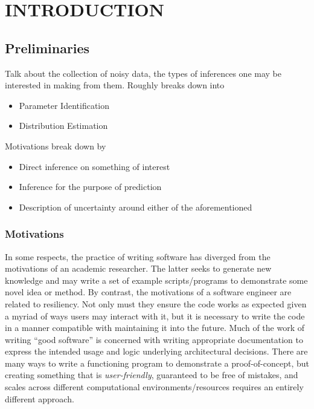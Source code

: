 \chapter{\uppercase{Introduction}} \label{chapter:01}

\section{Preliminaries}
Talk about the collection of noisy data, the types of inferences one may be interested in making from them.
Roughly breaks down into
\begin{itemize}
  \item Parameter Identification
  \item Distribution Estimation
\end{itemize}

Motivations break down by

\begin{itemize}
  \item Direct inference on something of interest
  \item Inference for the purpose of prediction
  \item Description of uncertainty around either of the aforementioned
\end{itemize}

\subsection{Motivations}\label{sec:motivations}
In some respects, the practice of writing software has diverged from the motivations of an academic researcher.
The latter seeks to generate new knowledge and may write a set of example scripts/programs to demonstrate some novel idea or method.
By contrast, the motivations of a software engineer are related to resiliency.
Not only must they ensure the code works as expected given a myriad of ways users may interact with it, but it is necessary to write the code in a manner compatible with maintaining it into the future.
Much of the work of writing ``good software'' is concerned with writing appropriate documentation to express the intended usage and logic underlying architectural decisions.
There are many ways to write a functioning program to demonstrate a proof-of-concept, but creating something that is \emph{user-friendly}, guaranteed to be free of mistakes, and scales across different computational environments/resources requires an entirely different approach.

